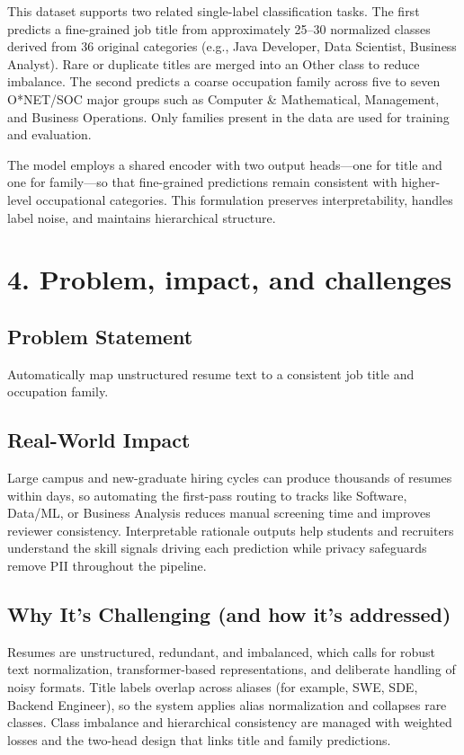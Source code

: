 \documentclass[12pt]{article}
\begin{document}
\medskip

\noindent This dataset supports two related single-label classification tasks. The first predicts a fine-grained job title from approximately 25--30 normalized classes derived from 36 original categories (e.g., Java Developer, Data Scientist, Business Analyst). Rare or duplicate titles are merged into an Other class to reduce imbalance. The second predicts a coarse occupation family across five to seven O*NET/SOC major groups such as Computer \& Mathematical, Management, and Business Operations. Only families present in the data are used for training and evaluation.

\medskip

\noindent The model employs a shared encoder with two output heads---one for title and one for family---so that fine-grained predictions remain consistent with higher-level occupational categories. This formulation preserves interpretability, handles label noise, and maintains hierarchical structure.

\section*{4. Problem, impact, and challenges}
\subsection*{Problem Statement}
Automatically map unstructured resume text to a consistent job title and occupation family.

\medskip

\subsection*{Real-World Impact}
Large campus and new-graduate hiring cycles can produce thousands of resumes within days, so automating the first-pass routing to tracks like Software, Data/ML, or Business Analysis reduces manual screening time and improves reviewer consistency. Interpretable rationale outputs help students and recruiters understand the skill signals driving each prediction while privacy safeguards remove PII throughout the pipeline.

\medskip

\subsection*{Why It’s Challenging (and how it’s addressed)}
Resumes are unstructured, redundant, and imbalanced, which calls for robust text normalization, transformer-based representations, and deliberate handling of noisy formats. Title labels overlap across aliases (for example, SWE, SDE, Backend Engineer), so the system applies alias normalization and collapses rare classes. Class imbalance and hierarchical consistency are managed with weighted losses and the two-head design that links title and family predictions.
\end{document}
